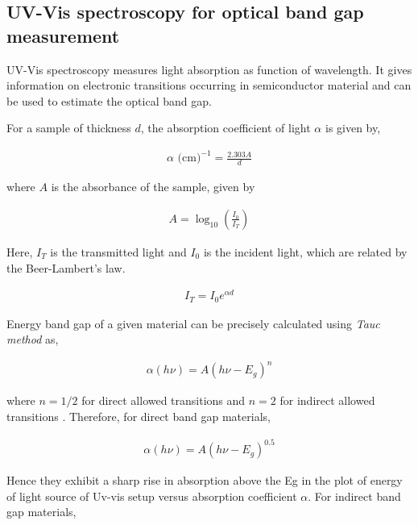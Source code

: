 \subsection{UV-Vis spectroscopy for optical band gap measurement}
UV-Vis spectroscopy measures light absorption as function of wavelength. It gives information on electronic transitions occurring in semiconductor material and can be used to estimate the optical band gap. 

For a sample of thickness $d$, the absorption coefficient of light $\alpha$ is given by, 

\begin{align} \label{1}
    \alpha \text{ (cm)}^{-1} = \frac{2.303A}{d}
\end{align}

where $A$ is the absorbance of the sample, given by

\begin{align} \label{eq}
    A = \log_{10} \left(\frac{I_0}{I_T}\right)
\end{align}

Here, $I_T$ is the transmitted light and $I_0$ is the incident light, which are related by the Beer-Lambert's law. 

\begin{align}
    I_T = I_0 e^{\alpha d}
\end{align}

Energy band gap of a given material can be precisely calculated using \textit{Tauc method} as,

\begin{align}
    \alpha(h\nu) = A(h\nu - E_g)^n
\end{align}

where $n=1/2$ for direct allowed transitions and $n=2$ for indirect allowed transitions \cite{Pankove_1975}. Therefore, for direct band gap materials,

\begin{align} \label{directeq}
    \alpha(h\nu) = A(h\nu - E_g)^{0.5}
\end{align}

Hence they exhibit a sharp rise in absorption above the Eg in the plot of energy of light source of Uv-vis setup versus absorption coefficient $\alpha$. For indirect band gap materials,

